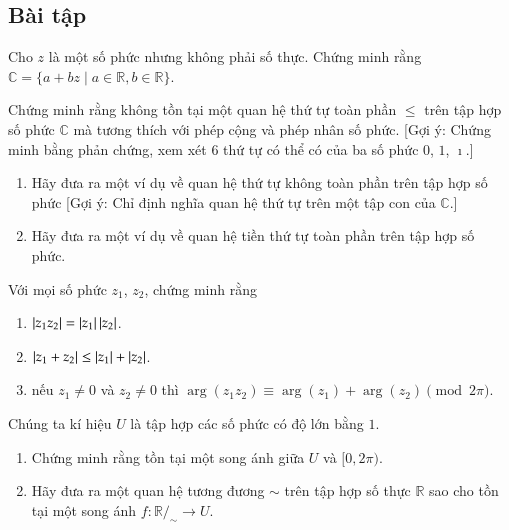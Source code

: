 \subsection{Bài tập}

\begin{exercise}
	Cho $z$ là một số phức nhưng không phải số thực. Chứng minh rằng $\mathbb{C} = \{ a + bz \mid a\in\mathbb{R}, b\in\mathbb{R} \}$.
\end{exercise}

\begin{exercise}\label{example:lost-of-total-ordering-on-C}
	Chứng minh rằng không tồn tại một quan hệ thứ tự toàn phần $\leq$ trên tập hợp số phức $\mathbb{C}$ mà tương thích với phép cộng và phép nhân số phức. [Gợi ý: Chứng minh bằng phản chứng, xem xét 6 thứ tự có thể có của ba số phức $0$, $1$, $\imath$.]
\end{exercise}

\begin{exercise}
    \begin{enumerate}[label={(\roman*)}]
        \item Hãy đưa ra một ví dụ về quan hệ thứ tự không toàn phần trên tập hợp số phức [Gợi ý: Chỉ định nghĩa quan hệ thứ tự trên một tập con của $\mathbb{C}$.]
        \item Hãy đưa ra một ví dụ về quan hệ tiền thứ tự toàn phần trên tập hợp số phức.
    \end{enumerate}
\end{exercise}

\begin{exercise}
	Với mọi số phức $z_{1}$, $z_{2}$, chứng minh rằng
	\begin{enumerate}[label={(\roman*)}]
		\item $\left\vert{z_{1}z_{2}}\right\vert = \left\vert{z_{1}}\right\vert\left\vert{z_{2}}\right\vert$.
		\item $\left\vert{z_{1} + z_{2}}\right\vert\leq \left\vert{z_{1}}\right\vert + \left\vert{z_{2}}\right\vert$.
		\item nếu $z_{1}\ne 0$ và $z_{2}\ne 0$ thì $\arg{(z_{1}z_{2})}\equiv \arg{(z_{1})} + \arg{(z_{2})} \pmod{2\pi}$.
	\end{enumerate}
\end{exercise}

\begin{exercise}
	Chúng ta kí hiệu $U$ là tập hợp các số phức có độ lớn bằng $1$.
	\begin{enumerate}[label={(\roman*)}]
		\item Chứng minh rằng tồn tại một song ánh giữa $U$ và $[0, 2\pi)$.
		\item Hãy đưa ra một quan hệ tương đương $\sim$ trên tập hợp số thực $\mathbb{R}$ sao cho tồn tại một song ánh $f: \mathbb{R}/_{\sim} \to U$.
	\end{enumerate}
\end{exercise}

